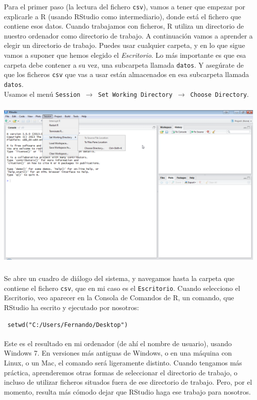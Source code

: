 \documentclass[10pt,a4paper]{article}\usepackage[]{graphicx}\usepackage[]{color}
\newcounter {cont01}
\begin{document}
Para el primer paso (la lectura del fichero {\tt csv}), vamos a tener que empezar por explicarle a R (usando RStudio como intermediario), donde está el fichero que contiene esos datos. Cuando trabajamos con ficheros, R utiliza un directorio de nuestro ordenador como {\sf directorio de trabajo}. A continuación vamos a aprender a elegir un directorio de trabajo. Puedes usar cualquier carpeta, y en lo que sigue vamos a suponer que hemos elegido el {\em Escritorio}. Lo más importante es que esa carpeta debe contener a su vez, una subcarpeta llamada {\tt datos}. Y asegúrate de que los ficheros {\tt csv} que vas a usar están almacenados en esa subcarpeta llamada {\tt datos}.\\

Usamos el menú {\tt Session $\to$ Set Working Directory $\to$ Choose Directory}.
    \begin{center}
    \includegraphics[height=8.5cm]{../fig/Tut03-18.png}
    \end{center}
Se abre un cuadro de diálogo del sistema, y navegamos hasta la carpeta que contiene el fichero {\tt csv}, que en mi caso es el {\tt Escritorio}. Cuando selecciono el Escritorio, veo aparecer en la Consola de Comandos de R, un comando, que RStudio ha escrito y ejecutado por nosotros:

\begin{center}
\verb# setwd("C:/Users/Fernando/Desktop") #
\end{center}
\paragraph*{}\label{tut02:lugar:ComandoSetwd}Este es el resultado en mi ordenador (de ahí el nombre de usuario), usando Windows 7. En versiones más antiguas de Windows, o en una máquina con Linux, o un Mac, el comando será ligeramente distinto. Cuando tengamos más práctica, aprenderemos otras formas de seleccionar el directorio de trabajo, o incluso de utilizar ficheros situados fuera de ese directorio de trabajo. Pero, por el momento, resulta más cómodo dejar que \mbox{RStudio} haga ese trabajo para nosotros.
\end{document}
